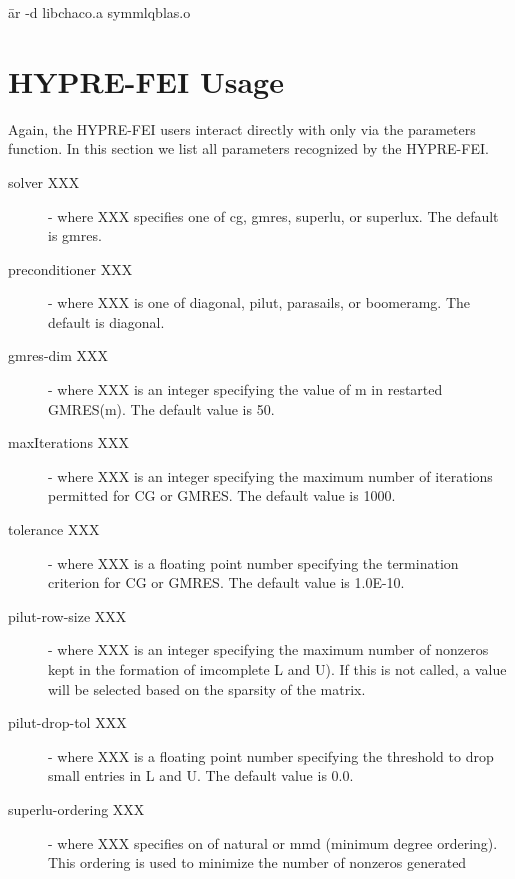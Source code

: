 \begin{tabbing}
\hspace{0.5in} \= {\sf ar -d libchaco.a symmlqblas.o}
\end{tabbing}

 
\section{HYPRE-FEI Usage}

Again, the HYPRE-FEI users interact directly with \hypre{} only via the {\sf parameters}
function.  In this section we list all parameters recognized by the HYPRE-FEI.

\begin{description}
\item[solver XXX] - where XXX specifies one of {\sf cg}, {\sf gmres},
                    {\sf superlu}, or {\sf superlux}.  The default is {\sf gmres}.
\item[preconditioner XXX] - where XXX is one of {\sf diagonal}, {\sf pilut},
                    {\sf parasails}, or {\sf boomeramg}. The default 
                    is {\sf diagonal}.
\item[gmres-dim XXX] - where XXX is an integer specifying the value of m in
                       restarted GMRES(m).  The default value is 50.
\item[maxIterations XXX] - where XXX is an integer specifying the maximum number
                           of iterations permitted for CG or GMRES.
                           The default value is 1000.
\item[tolerance XXX] - where XXX is a floating point number specifying the 
                       termination criterion for CG or GMRES.  The default value is
                       1.0E-10.
\item[pilut-row-size XXX] - where XXX is an integer specifying the maximum
                       number of nonzeros kept in the formation of imcomplete L
                       and U).  If this is not called, a value will be selected
                       based on the sparsity of the matrix.
\item[pilut-drop-tol XXX] - where XXX is a floating point number specifying the 
                       threshold to drop small entries in L and U.  The default
                       value is 0.0.
\item[superlu-ordering XXX] - where XXX specifies on of {\sf natural} or
                       {\sf mmd} (minimum degree ordering).  This ordering
                       is used to minimize the number of nonzeros generated

\end{description}
